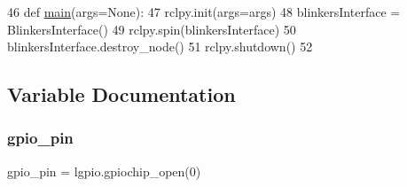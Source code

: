 \begin{DoxyCode}
46 \textcolor{keyword}{def }\mbox{\hyperlink{namespacetoxic__hardware_1_1blinkers__interface_a205606096f1ce3bb8e412a407bee6b4b}{main}}(args=None):
47     rclpy.init(args=args)
48     blinkersInterface = BlinkersInterface()
49     rclpy.spin(blinkersInterface)
50     blinkersInterface.destroy\_node()
51     rclpy.shutdown()
52 
\end{DoxyCode}


\subsection{Variable Documentation}
\mbox{\label{namespacetoxic__hardware_1_1blinkers__interface_a6fd15ce64110e98b208bfe7a4ed33f52}} 
\subsubsection{\texorpdfstring{gpio\+\_\+pin}{gpio\_pin}}
{\footnotesize\ttfamily gpio\+\_\+pin = lgpio.\+gpiochip\+\_\+open(0)}

